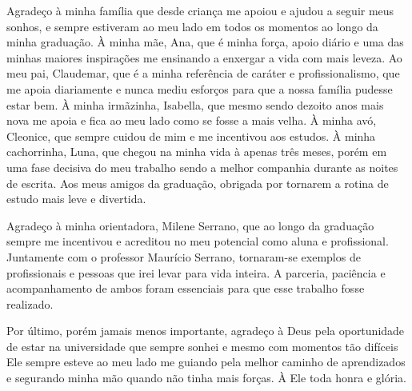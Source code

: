 \begin{agradecimentos}

Agradeço à minha família que desde criança me apoiou e ajudou a seguir meus sonhos, e sempre estiveram ao meu lado em todos os momentos ao longo da minha graduação. À minha mãe, Ana, que é minha força, apoio diário e uma das minhas maiores inspirações me ensinando a enxergar a vida com mais leveza. Ao meu pai, Claudemar, que é a minha referência de caráter e profissionalismo, que me apoia diariamente e nunca mediu esforços para que a nossa família pudesse estar bem. À minha irmãzinha, Isabella, que mesmo sendo dezoito anos mais nova me apoia e fica ao meu lado como se fosse a mais velha. À minha avó, Cleonice, que sempre cuidou de mim e me incentivou aos estudos. À minha cachorrinha, Luna, que chegou na minha vida à apenas três meses, porém em uma fase decisiva do meu trabalho sendo a melhor companhia durante as noites de escrita. Aos meus amigos da graduação, obrigada por tornarem a rotina de estudo mais leve e divertida.

Agradeço à minha orientadora, Milene Serrano, que ao longo da graduação sempre me incentivou e acreditou no meu potencial como aluna e profissional. Juntamente com o professor Maurício Serrano, tornaram-se exemplos de profissionais e pessoas que irei levar para vida inteira. A parceria, paciência e acompanhamento de ambos foram essenciais para que esse trabalho fosse realizado.

Por último, porém jamais menos importante, agradeço à Deus pela oportunidade de estar na universidade que sempre sonhei e mesmo com momentos tão difíceis Ele sempre esteve ao meu lado me guiando pela melhor caminho de aprendizados e segurando minha mão quando não tinha mais forças. À Ele toda honra e glória.

\end{agradecimentos}
